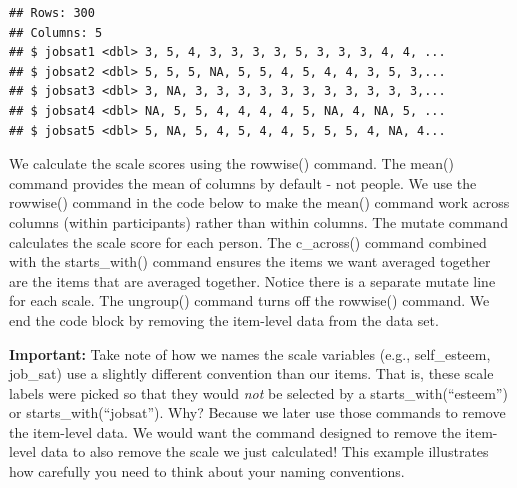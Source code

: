 \documentclass[
]{krantz}
\makeatletter
\newenvironment{Shaded}{\begin{snugshade}}{\end{snugshade}}
\newcommand{\KeywordTok}[1]{\textcolor[rgb]{0.27,0.27,0.27}{\textbf{#1}}}
\newcommand{\NormalTok}[1]{#1}
\newcommand{\OperatorTok}[1]{\textcolor[rgb]{0.43,0.43,0.43}{\textbf{#1}}}
\newcommand{\StringTok}[1]{\textcolor[rgb]{0.5,0.5,0.5}{#1}}
\newenvironment{kframe}{%
\medskip{}
\setlength{\fboxsep}{.8em}
 \def\at@end@of@kframe{}%
 \ifinner\ifhmode%
  \def\at@end@of@kframe{\end{minipage}}%
  \begin{minipage}{\columnwidth}%
 \fi\fi%
 \def\FrameCommand##1{\hskip\@totalleftmargin \hskip-\fboxsep
 \colorbox{shadecolor}{##1}\hskip-\fboxsep
     \hskip-\linewidth \hskip-\@totalleftmargin \hskip\columnwidth}%
 \MakeFramed {\advance\hsize-\width
   \@totalleftmargin\z@ \linewidth\hsize
   \@setminipage}}%
 {\par\unskip\endMakeFramed%
 \at@end@of@kframe}
\renewenvironment{Shaded}{\begin{kframe}}{\end{kframe}}
\makeatother
\begin{document}
\begin{Shaded}
\end{Shaded}

\begin{verbatim}
## Rows: 300
## Columns: 5
## $ jobsat1 <dbl> 3, 5, 4, 3, 3, 3, 3, 5, 3, 3, 3, 4, 4, ...
## $ jobsat2 <dbl> 5, 5, 5, NA, 5, 5, 4, 5, 4, 4, 3, 5, 3,...
## $ jobsat3 <dbl> 3, NA, 3, 3, 3, 3, 3, 3, 3, 3, 3, 3, 3,...
## $ jobsat4 <dbl> NA, 5, 5, 4, 4, 4, 4, 5, NA, 4, NA, 5, ...
## $ jobsat5 <dbl> 5, NA, 5, 4, 5, 4, 4, 5, 5, 5, 4, NA, 4...
\end{verbatim}

We calculate the scale scores using the rowwise() command. The mean() command provides the mean of columns by default - not people. We use the rowwise() command in the code below to make the mean() command work across columns (within participants) rather than within columns. The mutate command calculates the scale score for each person. The c\_across() command combined with the starts\_with() command ensures the items we want averaged together are the items that are averaged together. Notice there is a separate mutate line for each scale. The ungroup() command turns off the rowwise() command. We end the code block by removing the item-level data from the data set.

\textbf{Important:} Take note of how we names the scale variables (e.g., self\_esteem, job\_sat) use a slightly different convention than our items. That is, these scale labels were picked so that they would \emph{not} be selected by a starts\_with(``esteem'') or starts\_with(``jobsat''). Why? Because we later use those commands to remove the item-level data. We would want the command designed to remove the item-level data to also remove the scale we just calculated! This example illustrates how carefully you need to think about your naming conventions.
\end{document}
